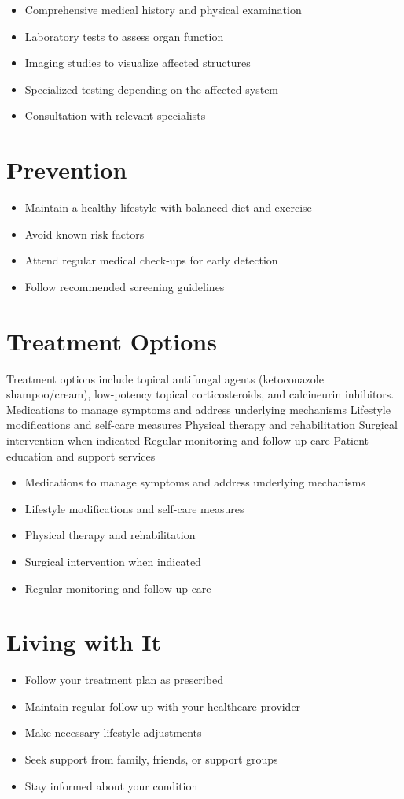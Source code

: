 \begin{itemize}[noitemsep]
  \item Comprehensive medical history and physical examination
  \item Laboratory tests to assess organ function
  \item Imaging studies to visualize affected structures
  \item Specialized testing depending on the affected system
  \item Consultation with relevant specialists
\end{itemize}
\section{Prevention}
\begin{itemize}[noitemsep]
  \item Maintain a healthy lifestyle with balanced diet and exercise
  \item Avoid known risk factors
  \item Attend regular medical check-ups for early detection
  \item Follow recommended screening guidelines
\end{itemize}
\section{Treatment Options}
Treatment options include topical antifungal agents (ketoconazole shampoo/cream), low-potency topical corticosteroids, and calcineurin inhibitors. Medications to manage symptoms and address underlying mechanisms Lifestyle modifications and self-care measures Physical therapy and rehabilitation Surgical intervention when indicated Regular monitoring and follow-up care Patient education and support services

\begin{itemize}[noitemsep]
  \item Medications to manage symptoms and address underlying mechanisms
  \item Lifestyle modifications and self-care measures
  \item Physical therapy and rehabilitation
  \item Surgical intervention when indicated
  \item Regular monitoring and follow-up care
\end{itemize}
\section{Living with It}
\begin{itemize}[noitemsep]
  \item Follow your treatment plan as prescribed
  \item Maintain regular follow-up with your healthcare provider
  \item Make necessary lifestyle adjustments
  \item Seek support from family, friends, or support groups
  \item Stay informed about your condition
\end{itemize}
